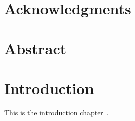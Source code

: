 \documentclass[a4paper,12pt,twoside]{book}
\title{\thesisTitle}
\author{\thesisAuthor}
\date{\thesisDate}
\begin{document}
\frontmatter
\pagestyle{empty}



\chapter*{Acknowledgments}
    \thispagestyle{empty}

\pagestyle{fancy}
\fancyhf{} %
\fancyhead[LE]{\nouppercase{\leftmark}}  %
\fancyhead[RO]{\nouppercase{\rightmark}}  %

\renewcommand{\headrulewidth}{0.4pt}  %


\chapter*{Abstract}
    \setcounter{page}{1}

    \tableofcontents
\clearpage

    \listoffigures
\clearpage

\glsresetall

\mainmatter
\chapter{Introduction}
\label{sec_intro}

This is the introduction chapter~\cite{moores_law}.



\end{document}
